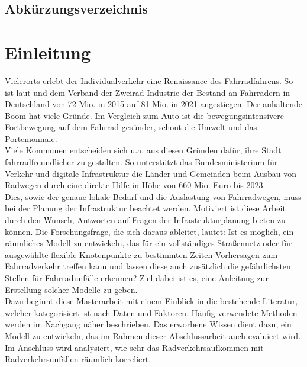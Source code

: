 \documentclass[a4paper,12pt]{thesis}
\begin{document}
\begingroup
\let\clearpage\relax
\listoffigures
\listoftables
\endgroup

\section{Abkürzungsverzeichnis}

\begin{acronym}
\end{acronym}


\chapter{Einleitung}

Vielerorts erlebt der Individualverkehr eine Renaissance des Fahrradfahrens. So ist laut \cite{Eisenberger2015} und dem Verband der Zweirad Industrie \cite{ZIV2022} der Bestand an Fahrrädern in Deutschland von 72 Mio. in 2015 auf 81 Mio. in 2021 angestiegen. Der anhaltende Boom hat viele Gründe. Im Vergleich zum Auto ist die bewegungsintensivere Fortbewegung auf dem Fahrrad gesünder, schont die Umwelt und das Portemonnaie.\\
Viele Kommunen entscheiden sich u.a. aus diesen Gründen dafür, ihre Stadt fahrradfreundlicher zu gestalten. So unterstützt das Bundesministerium für Verkehr und digitale Infrastruktur \cite{VerkehrunddigitaleInfrastruktur2020} die Länder und Gemeinden beim Ausbau von Radwegen durch eine direkte Hilfe in Höhe von 660 Mio. Euro bis 2023.\\
Dies, sowie der genaue lokale Bedarf und die Auslastung von Fahrradwegen, muss bei der Planung der Infrastruktur beachtet werden. Motiviert ist diese Arbeit durch den Wunsch, Antworten auf Fragen der Infrastrukturplanung bieten zu können. Die Forschungsfrage, die sich daraus ableitet, lautet: Ist es möglich, ein räumliches Modell zu entwickeln, das für ein vollständiges Straßennetz oder für ausgewählte flexible Knotenpunkte zu bestimmten Zeiten Vorhersagen zum Fahrradverkehr treffen kann und lassen diese auch zusätzlich die gefährlichsten Stellen für Fahrradunfälle erkennen? Ziel dabei ist es, eine Anleitung zur Erstellung solcher Modelle zu geben.\\
Dazu beginnt diese Masterarbeit mit einem Einblick in die bestehende Literatur, welcher kategorisiert ist nach Daten und Faktoren. Häufig verwendete Methoden werden im Nachgang näher beschrieben. Das erworbene Wissen dient dazu, ein Modell zu entwickeln, das im Rahmen dieser Abschlussarbeit auch evaluiert wird. Im Anschluss wird analysiert, wie sehr das Radverkehrsaufkommen mit Radverkehrsunfällen räumlich korreliert.
\end{document}
